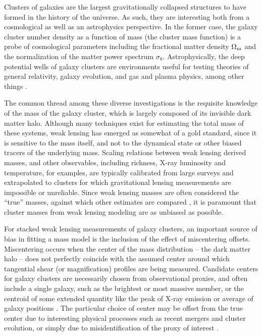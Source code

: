 \documentclass[twocolumn]{aastex6}
\begin{document}
Clusters of galaxies are the largest gravitationally collapsed structures to have formed in the history of the universe.  As such, they are interesting both from a cosmological as well as an astrophysics perspective. In the former case, the galaxy cluster number density as a function of mass (the cluster mass function) is a probe of cosmological parameters including the fractional matter density $\Omega_{\rm m}$ and the normalization of the matter power spectrum $\sigma_8$. Astrophysically, the deep potential wells of galaxy clusters are environments useful for testing theories of general relativity, galaxy evolution, and gas and plasma physics, among other things \citep{Voit05}. 

The common thread among these diverse investigations is the requisite knowledge of the mass of the galaxy cluster, which is largely composed of its invisible dark matter halo. Although many techniques exist for estimating the total mass of these systems, weak lensing has emerged as somewhat of a gold standard, since it is sensitive to the mass itself, and not to the dynamical state or other biased tracers of the underlying mass. Scaling relations between weak lensing derived masses, and other observables, including richness, X-ray luminosity and temperature, for examples, are typically calibrated from large surveys and extrapolated to clusters for which gravitational lensing measurements are impossible or unreliable. Since weak lensing masses are often considered the ``true'' masses, against which other estimates are compared \citep[e.g.][]{Leauthaud10, vonderLinden14, Hoekstra15}, it is paramount that cluster masses from weak lensing modeling are as unbiased as possible.

For stacked weak lensing measurements of galaxy clusters, an important source of bias in fitting a mass model is the inclusion of the effect of miscentering offsets. Miscentering occurs when the center of the mass distribution -- the dark matter halo -- does not perfectly coincide with the assumed center around which tangential shear (or magnification) profiles are being measured. Candidate centers for galaxy clusters are necessarily chosen from observational proxies, and often include a single galaxy, such as the brightest or most massive member, or the centroid of some extended quantity like the peak of X-ray emission or average of galaxy positions \citep{George12}. The particular choice of center may be offset from the true center due to interesting physical processes such as recent mergers and cluster evolution, or simply due to misidentification of the proxy of interest \citep{Johnston07}. 
\end{document}
